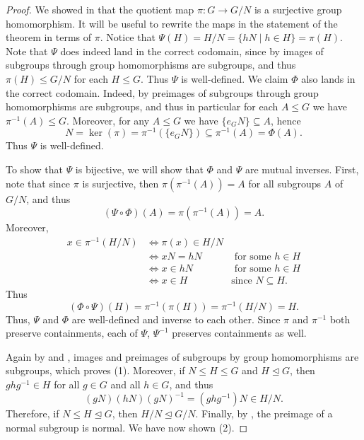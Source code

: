 \documentclass[12pt]{report}
\numberwithin{equation}{section}
\numberwithin{theorem}{chapter}
\theoremstyle{definition}
\newtheorem*{basic properties}{Basic Properties}
\newtheorem*{Important Remark}{Important Remark}
\renewcommand{\ker}{\operatorname{ker}}
\def\norm{\mathrel{\unlhd}}
\begin{document}
\begin{proof} 
We showed in  that the quotient map $\pi\!:G\to G/N$ is a surjective group homomorphism. It will be useful to rewrite the maps in the statement of the theorem in terms of $\pi$.
Notice that $\Psi(H)=H/N=\{hN \mid h\in H\}=\pi(H)$.
Note that $\Psi$ does indeed land in the correct codomain, since by  images of subgroups through group homomorphisms are subgroups, and thus $\pi(H)\leq G/N$ for each $H \leq G$. Thus $\Psi$ is well-defined.
We claim $\Phi$ also lands in the correct codomain. Indeed, by  preimages of subgroups through group homomorphisms are subgroups, and thus in particular for each $A \leq G$ we have $\pi^{-1}(A)\leq G$. Moreover, for any $A \leq G$ we have
$\{e_GN\} \subseteq A$, hence 
$$N = \ker(\pi) = \pi^{-1}(\{e_GN\}) \subseteq \pi^{-1}(A) = \Phi(A).$$
Thus $\Psi$ is well-defined.

To show that $\Psi$ is bijective, we will show that $\Phi$ and $\Psi$ are mutual inverses. First, note that since $\pi$ is surjective, then $\pi(\pi^{-1}(A))=A$ for all subgroups $A$ of $G/N$, and thus
$$(\Psi\circ\Phi)(A)=\pi(\pi^{-1}(A))=A.$$
Moreover, 
\begin{align*}
    x\in \pi^{-1}(H/N) &\iff \pi(x)\in H/N \\
    & \iff xN=hN & \text{ for some } h\in H \\
    & \iff x\in hN & \text{ for some } h\in H \\
    & \iff x\in H & \text{since } N\subseteq H.
    \end{align*}
Thus
$$(\Phi\circ\Psi)(H)=\pi^{-1}(\pi(H))=\pi^{-1}(H/N)=H.$$
Thus, $\Psi$ and $\Phi$ are well-defined and inverse to each other. Since $\pi$ and $\pi^{-1}$ both preserve containments, each of $\Psi$, $\Psi^{-1}$ preserves containments as well.



Again by  and , images and preimages of subgroups by group homomorphisms are subgroups, which proves (1). Moreover, if $N \leq H \leq G$ and $H \norm G$, then $ghg^{-1} \in H$ for all $g \in G$ and all $h \in G$, and thus
$$(gN)(hN)(gN)^{-1}= (ghg^{-1})N \in H/N.$$
Therefore, if $N \leq H \norm G$, then $H/N \norm G/N$. Finally, by , the preimage of a normal subgroup is normal. We have now shown (2).


\end{proof}
\end{document}
